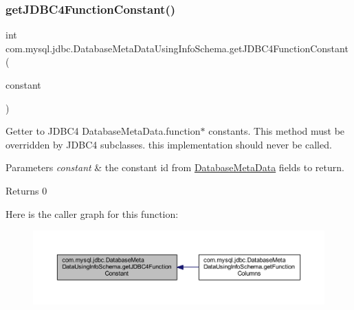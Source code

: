 \subsubsection{\texorpdfstring{get\+J\+D\+B\+C4\+Function\+Constant()}{getJDBC4FunctionConstant()}}
{\footnotesize\ttfamily int com.\+mysql.\+jdbc.\+Database\+Meta\+Data\+Using\+Info\+Schema.\+get\+J\+D\+B\+C4\+Function\+Constant (\begin{DoxyParamCaption}\item[{\mbox{\hyperlink{enumcom_1_1mysql_1_1jdbc_1_1_database_meta_data_using_info_schema_1_1_j_d_b_c4_function_constant}{J\+D\+B\+C4\+Function\+Constant}}}]{constant }\end{DoxyParamCaption})\hspace{0.3cm}{\ttfamily [protected]}}

Getter to J\+D\+B\+C4 Database\+Meta\+Data.\+function$\ast$ constants. This method must be overridden by J\+D\+B\+C4 subclasses. this implementation should never be called.


\begin{DoxyParams}{Parameters}
{\em constant} & the constant id from \mbox{\hyperlink{classcom_1_1mysql_1_1jdbc_1_1_database_meta_data}{Database\+Meta\+Data}} fields to return.\\
\hline
\end{DoxyParams}
\begin{DoxyReturn}{Returns}
0 
\end{DoxyReturn}
Here is the caller graph for this function\+:
\nopagebreak
\begin{figure}[H]
\begin{center}
\leavevmode
\includegraphics[width=350pt]{classcom_1_1mysql_1_1jdbc_1_1_database_meta_data_using_info_schema_a7c25e43c46f40752d923944f2d6f9bcc_icgraph}
\end{center}
\end{figure}
\mbox{\label{classcom_1_1mysql_1_1jdbc_1_1_database_meta_data_using_info_schema_a29cf035125a66f19f874935b8cc8138a}} 
